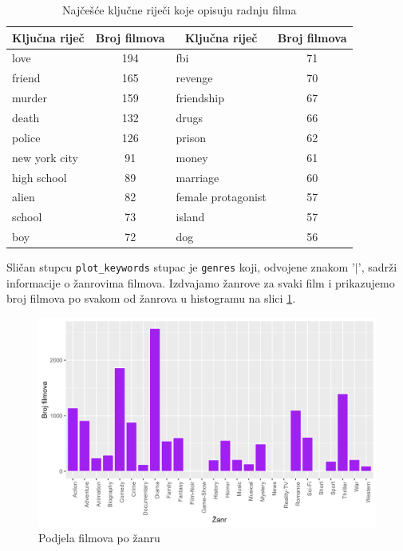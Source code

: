 	 \begin{table}[H]
	 	\centering
	 	\renewcommand{\arraystretch}{1.5} %
	 	\begin{tabular}{|l|c|l|c|}
	 		\hline
	 		\multicolumn{1}{|c|}{\textbf{Ključna riječ}} & \multicolumn{1}{c|}{\textbf{Broj filmova}} & \multicolumn{1}{c|}{\textbf{Ključna riječ}} & \multicolumn{1}{c|}{\textbf{Broj filmova}} \\
	 		\hline
	 		love & 194 & fbi & 71 \\
	 		\hline
	 		friend & 165 & revenge & 70 \\
	 		\hline
	 		murder & 159 & friendship & 67 \\
	 		\hline
	 		death & 132 & drugs & 66 \\
	 		\hline
	 		police & 126 & prison & 62 \\
	 		\hline
	 		new york city & 91 & money & 61 \\
	 		\hline
	 		high school & 89 & marriage & 60 \\
	 		\hline
	 		alien & 82 & female protagonist & 57 \\
	 		\hline
	 		school & 73 & island & 57\\
	 		\hline
	 		boy & 72 & dog & 56\\
	 		\hline
	 	\end{tabular}
	 	\caption{Najčešće ključne riječi koje opisuju radnju filma}
	 	\label{keywords}
	 \end{table} 
	 
	 Sličan stupcu \texttt{plot\_keywords} stupac je \texttt{genres} koji, odvojene znakom '$|$', sadrži informacije o žanrovima filmova. Izdvajamo žanrove za svaki film i prikazujemo broj filmova po svakom od žanrova u histogramu na slici \ref{filmovi_zanr}.
	 
	 \begin{figure}[H]
	 	\centering
	 	\includegraphics[width=15cm]{../figures/analysis/broj_filmova_po_zanru.png}
	 	\caption{Podjela filmova po žanru}
	 	\label{filmovi_zanr}
	 \end{figure}
	 
